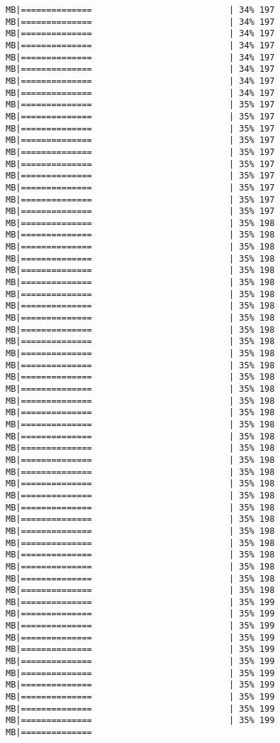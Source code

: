 \documentclass[
]{article}
\begin{document}
\begin{verbatim}
MB|==============                           | 34% 197 MB|==============                           | 34% 197 MB|==============                           | 34% 197 MB|==============                           | 34% 197 MB|==============                           | 34% 197 MB|==============                           | 34% 197 MB|==============                           | 34% 197 MB|==============                           | 34% 197 MB|==============                           | 35% 197 MB|==============                           | 35% 197 MB|==============                           | 35% 197 MB|==============                           | 35% 197 MB|==============                           | 35% 197 MB|==============                           | 35% 197 MB|==============                           | 35% 197 MB|==============                           | 35% 197 MB|==============                           | 35% 197 MB|==============                           | 35% 197 MB|==============                           | 35% 198 MB|==============                           | 35% 198 MB|==============                           | 35% 198 MB|==============                           | 35% 198 MB|==============                           | 35% 198 MB|==============                           | 35% 198 MB|==============                           | 35% 198 MB|==============                           | 35% 198 MB|==============                           | 35% 198 MB|==============                           | 35% 198 MB|==============                           | 35% 198 MB|==============                           | 35% 198 MB|==============                           | 35% 198 MB|==============                           | 35% 198 MB|==============                           | 35% 198 MB|==============                           | 35% 198 MB|==============                           | 35% 198 MB|==============                           | 35% 198 MB|==============                           | 35% 198 MB|==============                           | 35% 198 MB|==============                           | 35% 198 MB|==============                           | 35% 198 MB|==============                           | 35% 198 MB|==============                           | 35% 198 MB|==============                           | 35% 198 MB|==============                           | 35% 198 MB|==============                           | 35% 198 MB|==============                           | 35% 198 MB|==============                           | 35% 198 MB|==============                           | 35% 198 MB|==============                           | 35% 198 MB|==============                           | 35% 198 MB|==============                           | 35% 199 MB|==============                           | 35% 199 MB|==============                           | 35% 199 MB|==============                           | 35% 199 MB|==============                           | 35% 199 MB|==============                           | 35% 199 MB|==============                           | 35% 199 MB|==============                           | 35% 199 MB|==============                           | 35% 199 MB|==============                           | 35% 199 MB|==============                           | 35% 199 MB|==============        
\end{verbatim}
\end{document}
